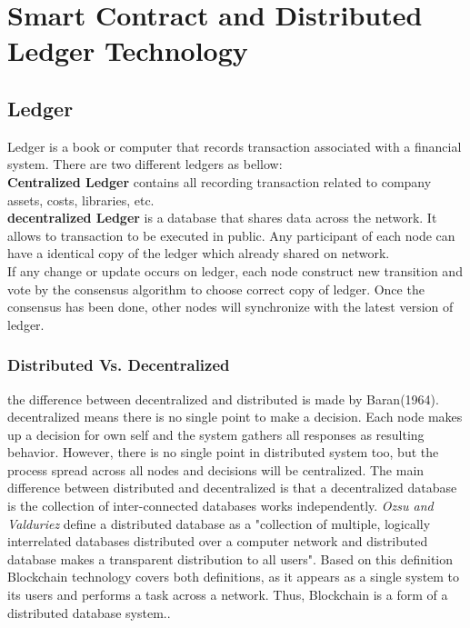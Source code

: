 \chapter{Smart Contract and Distributed Ledger Technology}

\section{Ledger} 
Ledger is a book or computer that records transaction associated with a financial system. There are two different ledgers as bellow: \\
\textbf{Centralized Ledger} contains all recording transaction related to company assets, costs, libraries, etc. \\
\textbf{decentralized Ledger } is a database that shares data across the network. It allows to transaction to be executed in public. Any participant of each node can have a identical copy of the ledger which already shared on network.\\
If any change or update occurs on ledger, each node construct new transition and vote by the consensus algorithm to choose correct copy of ledger. Once the consensus has been done, other nodes will synchronize with the latest version of ledger\cite{Markos}.

\subsection{Distributed Vs. Decentralized } 
the difference between decentralized and distributed is made by Baran(1964). decentralized means there is no single point to make a decision. Each node makes up a decision for own self and the system gathers all responses as resulting behavior. However, there is no single point in distributed system too, but the process spread across all nodes and decisions will be centralized. The main difference between distributed and decentralized is that a decentralized database is the collection of inter-connected databases works independently. \textit{Ozsu and Valduriez} define a distributed database as a "collection of multiple, logically interrelated databases distributed over a computer network and distributed database makes a transparent distribution to all users"\cite{Ozsu}. Based on this definition Blockchain technology covers both definitions, as it appears as a single system to its users and performs a task across a network. Thus, Blockchain is a form of a distributed database system.\cite{Markos}.


